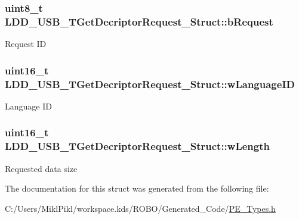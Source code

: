 \subsubsection[{b\+Request}]{\setlength{\rightskip}{0pt plus 5cm}uint8\+\_\+t L\+D\+D\+\_\+\+U\+S\+B\+\_\+\+T\+Get\+Decriptor\+Request\+\_\+\+Struct\+::b\+Request}\label{struct_l_d_d___u_s_b___t_get_decriptor_request___struct_aa7651472aa5110086f335c0b79c0bc5b}
Request I\+D \hypertarget{struct_l_d_d___u_s_b___t_get_decriptor_request___struct_a228c41af26c45c1fa18d964c0702a4b4}{}
\subsubsection[{w\+Language\+I\+D}]{\setlength{\rightskip}{0pt plus 5cm}uint16\+\_\+t L\+D\+D\+\_\+\+U\+S\+B\+\_\+\+T\+Get\+Decriptor\+Request\+\_\+\+Struct\+::w\+Language\+I\+D}\label{struct_l_d_d___u_s_b___t_get_decriptor_request___struct_a228c41af26c45c1fa18d964c0702a4b4}
Language I\+D \hypertarget{struct_l_d_d___u_s_b___t_get_decriptor_request___struct_af9ac7409b4031aa6f3ec5da9d79b06eb}{}
\subsubsection[{w\+Length}]{\setlength{\rightskip}{0pt plus 5cm}uint16\+\_\+t L\+D\+D\+\_\+\+U\+S\+B\+\_\+\+T\+Get\+Decriptor\+Request\+\_\+\+Struct\+::w\+Length}\label{struct_l_d_d___u_s_b___t_get_decriptor_request___struct_af9ac7409b4031aa6f3ec5da9d79b06eb}
Requested data size 

The documentation for this struct was generated from the following file\+:\begin{DoxyCompactItemize}
\item 
C\+:/\+Users/\+Mikl\+Pikl/workspace.\+kds/\+R\+O\+B\+O/\+Generated\+\_\+\+Code/\hyperlink{_p_e___types_8h}{P\+E\+\_\+\+Types.\+h}\end{DoxyCompactItemize}
